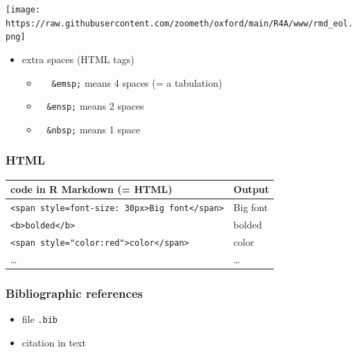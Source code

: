 \documentclass[
]{article}
\providecommand{\tightlist}{%
  \setlength{\itemsep}{0pt}\setlength{\parskip}{0pt}}
\begin{document}
\texttt{[image: https://raw.githubusercontent.com/zoometh/oxford/main/R4A/www/rmd\_eol.png]}

\begin{itemize}
\tightlist
\item
  extra spaces (HTML tags)

  \begin{itemize}
  \tightlist
  \item
      \texttt{\&emsp;} means 4 spaces (= a tabulation)
  \item
      \texttt{\&ensp;} means 2 spaces
  \item
    ~ \texttt{\&nbsp;} means 1 space
  \end{itemize}
\end{itemize}

\hypertarget{html}{%
\subsubsection{HTML}\label{html}}

\begin{longtable}[]{@{}ll@{}}
\toprule
code in R Markdown (= HTML) & Output \\
\midrule
\endhead
\texttt{\textless{}span\ style=\textquotesingle{}font-size:\ 30px\textquotesingle{}\textgreater{}Big\ font\textless{}/span\textgreater{}}
& {Big font} \\
\texttt{\textless{}b\textgreater{}bolded\textless{}/b\textgreater{}} &
bolded \\
\texttt{\textless{}span\ style="color:red"\textgreater{}color\textless{}/span\textgreater{}}
& {color} \\
\ldots{} & \ldots{} \\
\bottomrule
\end{longtable}

\hypertarget{bibliographic-references}{%
\subsubsection{Bibliographic
references}\label{bibliographic-references}}

\begin{itemize}
\tightlist
\item
  file \texttt{.bib}
\end{itemize}

\begin{itemize}
\tightlist
\item
  citation in text
\end{itemize}
\end{document}
